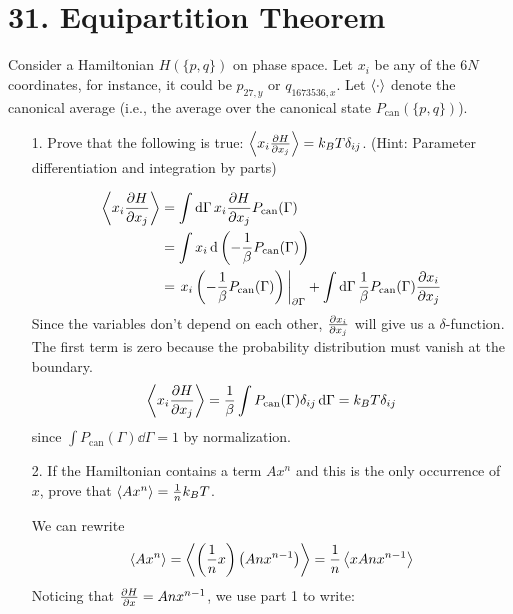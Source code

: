 \documentclass[a4paper,twoside]{article}
\begin{document}
\section*{31. Equipartition Theorem}
Consider a Hamiltonian $ H(\{p,q\}) $ on phase space. Let $ x_i $ be any of the $ 6N $ coordinates, for instance, it could be $ p_{27,y} $ or $ q_{1673536,x} $. Let $ \ev{\cdot} $ denote the canonical average (i.e., the average over the canonical state $ P_{\text{can}}(\{p,q\}) $).
\begin{itemize}
    \item[1.] Prove that the following is true: $ \ev{x_i \pdv{H}{x_j}} = k_B T \delta_{ij} $. (Hint: Parameter differentiation and integration by parts)
        \begin{problem}
            \begin{align}
                \ev{x_i \pdv{H}{x_j}} &= \int \dd{\Gamma} x_i \pdv{H}{x_j} P_{\text{can}}(\Gamma) \\
                &= \int  x_i \dd{\left( - \frac{1}{\beta} P_{\text{can}}(\Gamma) \right)} \\
                &= \eval{x_i \left( - \frac{1}{\beta} P_{\text{can}}(\Gamma) \right)}_{\partial\Gamma} + \int \dd{\Gamma} \frac{1}{\beta} P_{\text{can}}(\Gamma) \pdv{x_i}{x_j}
            \end{align}
            Since the variables don't depend on each other, $ \pdv{x_i}{x_j} $ will give us a $ \delta $-function. The first term is zero because the probability distribution must vanish at the boundary.
            \begin{equation}
                \ev{x_i \pdv{H}{x_j}} = \frac{1}{\beta} \int P_{\text{can}}(\Gamma) \delta_{ij} \dd{\Gamma} = k_B T \delta_{ij}
            \end{equation}
            since $ \int P_{\text{can}}(\Gamma) \dd{\Gamma} = 1 $ by normalization.
        \end{problem}
    \item[2.] If the Hamiltonian contains a term $ A x^n $ and this is the only occurrence of $ x $, prove that $ \ev{A x^n} = \frac{1}{n} k_B T $.
        \begin{problem}
            We can rewrite
            \begin{equation}
                \ev{Ax^n} = \ev{\left( \frac{1}{n} x \right)\left( Anx^{n-1} \right)} = \frac{1}{n} \ev{x Anx^{n-1}}
            \end{equation}
            Noticing that $ \pdv{H}{x} = Anx^{n-1} $, we use part 1 to write:
            \begin{equation}

\end{equation}
\end{problem}
\end{itemize}
\end{document}
